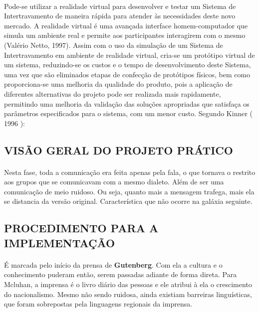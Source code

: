 \documentclass[12pt,a4paper]{article}
\begin{document}
\paragraph{}
Pode-se utilizar a realidade virtual para desenvolver e testar um Sistema de
Intertravamento de maneira rápida para atender às necessidades deste novo mercado. A
realidade virtual é uma avançada interface homem-computador que simula um ambiente real e
permite aos participantes interagirem com o mesmo (Valério Netto, 1997). Assim com o uso da
simulação de um Sistema de Intertravamento em ambiente de realidade virtual, cria-se um
protótipo virtual de um sistema, reduzindo-se os custos e o tempo de desenvolvimento deste
Sistema, uma vez que são eliminados etapas de confecção de protótipos físicos, bem como
proporciona-se uma melhoria da qualidade do produto, pois a aplicação de diferentes
alternativas do projeto pode ser realizada mais rapidamente, permitindo uma melhoria da
validação das soluções apropriadas que satisfaça os parâmetros especificados para o sistema,
com um menor custo. Segundo Kinner ( 1996 ):

\subsection{VISÃO GERAL DO PROJETO PRÁTICO}
\paragraph{}
Nesta fase, toda a comunicação era feita apenas pela fala, o que tornava o  restrito aos grupos que se comunicavam com a mesmo dialeto. Além de ser uma comunicação de meio ruidoso. Ou seja, quanto mais a mensagem trafega, mais ela se distancia da versão original. Característica que não ocorre na galáxia seguinte.

\subsection{PROCEDIMENTO PARA A IMPLEMENTAÇÃO}

\paragraph{}
É marcada pelo início da prensa de \textbf{Gutenberg}.
Com ela a cultura e o conhecimento puderam então, serem passadas adiante de forma direta.
Para Mcluhan, a imprensa é o livro diário das pessoas e ele atribui à ela o crescimento do nacionalismo. 
Mesmo não sendo ruidosa, ainda existiam barreiras linguísticas, que foram sobrepostas pela linguagens regionais da imprensa.
\end{document}
